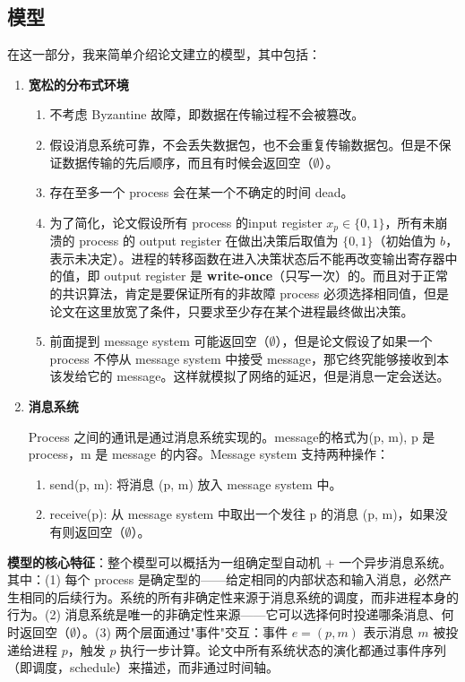 \documentclass[12pt, a4paper]{ctexart}
\theoremstyle{definition}
\theoremstyle{plain}
\theoremstyle{remark}
\begin{document}
\subsection{模型}
    在这一部分，我来简单介绍论文建立的模型，其中包括：
    \begin{enumerate}
        \item \textbf{宽松的分布式环境}
            \begin{enumerate}
                \item 不考虑 Byzantine 故障，即数据在传输过程不会被篡改。
                \item 假设消息系统可靠，不会丢失数据包，也不会重复传输数据包。但是不保证数据传输的先后顺序，而且有时候会返回空（$\emptyset$）。
                \item 存在至多一个 process 会在某一个不确定的时间 dead。
                \item 为了简化，论文假设所有 process 的input register $x_{p} \in \{0, 1\}$，所有未崩溃的 process 的 output register 在做出决策后取值为 $\{0, 1\}$（初始值为 $b$，表示未决定）。进程的转移函数在进入决策状态后不能再改变输出寄存器中的值，即 output register 是 \textbf{write-once}（只写一次）的。而且对于正常的共识算法，肯定是要保证所有的非故障 process 必须选择相同值，但是论文在这里放宽了条件，只要求至少存在某个进程最终做出决策。
                \item 前面提到 message system 可能返回空（$\emptyset$），但是论文假设了如果一个 process 不停从 message system 中接受 message，那它终究能够接收到本该发给它的 message。这样就模拟了网络的延迟，但是消息一定会送达。
            \end{enumerate}

        \item \textbf{消息系统}
        
            Process 之间的通讯是通过消息系统实现的。message的格式为(p, m), p 是 process，m 是 message 的内容。Message system 支持两种操作：
            \begin{enumerate}
                \item send(p, m): 将消息 (p, m) 放入 message system 中。
                \item receive(p): 从 message system 中取出一个发往 p 的消息 (p, m)，如果没有则返回空（$\emptyset$）。
            \end{enumerate}
    
    \end{enumerate}

    \textbf{模型的核心特征}：整个模型可以概括为一组确定型自动机 + 一个异步消息系统。其中：(1) 每个 process 是确定型的——给定相同的内部状态和输入消息，必然产生相同的后续行为。系统的所有非确定性来源于消息系统的调度，而非进程本身的行为。(2) 消息系统是唯一的非确定性来源——它可以选择何时投递哪条消息、何时返回空（$\emptyset$）。(3) 两个层面通过"事件"交互：事件 $e = (p, m)$ 表示消息 $m$ 被投递给进程 $p$，触发 $p$ 执行一步计算。论文中所有系统状态的演化都通过事件序列（即调度，schedule）来描述，而非通过时间轴。
\end{document}
